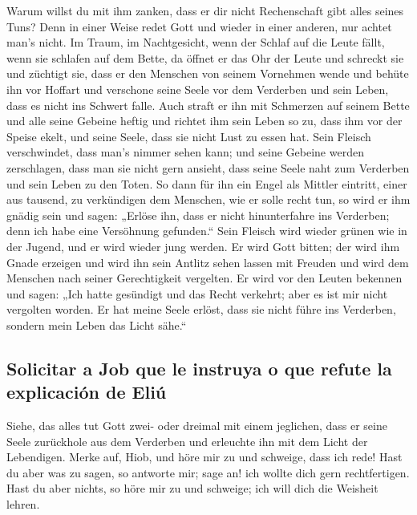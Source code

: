  Warum willst du mit ihm zanken, dass er dir nicht
Rechenschaft gibt alles seines Tuns?  Denn in einer Weise
redet Gott und wieder in einer anderen, nur achtet man's nicht.
 Im Traum, im Nachtgesicht, wenn der Schlaf auf die Leute
fällt, wenn sie schlafen auf dem Bette,  da öffnet er das
Ohr der Leute und schreckt sie und züchtigt sie,  dass er
den Menschen von seinem Vornehmen wende und behüte ihn vor Hoffart
 und verschone seine Seele vor dem Verderben und sein
Leben, dass es nicht ins Schwert falle.  Auch straft er
ihn mit Schmerzen auf seinem Bette und alle seine Gebeine heftig
 und richtet ihm sein Leben so zu, dass ihm vor der
Speise ekelt, und seine Seele, dass sie nicht Lust zu essen hat.
 Sein Fleisch verschwindet, dass man's nimmer sehen kann;
und seine Gebeine werden zerschlagen, dass man sie nicht gern ansieht,
 dass seine Seele naht zum Verderben und sein Leben zu
den Toten.  So dann für ihn ein Engel als Mittler
eintritt, einer aus tausend, zu verkündigen dem Menschen, wie er solle
recht tun,  so wird er ihm gnädig sein und sagen: „Erlöse
ihn, dass er nicht hinunterfahre ins Verderben; denn ich habe eine
Versöhnung gefunden.``  Sein Fleisch wird wieder grünen
wie in der Jugend, und er wird wieder jung werden.  Er
wird Gott bitten; der wird ihm Gnade erzeigen und wird ihn sein Antlitz
sehen lassen mit Freuden und wird dem Menschen nach seiner Gerechtigkeit
vergelten.  Er wird vor den Leuten bekennen und sagen:
„Ich hatte gesündigt und das Recht verkehrt; aber es ist mir nicht
vergolten worden.  Er hat meine Seele erlöst, dass sie
nicht führe ins Verderben, sondern mein Leben das Licht sähe.``

\hypertarget{solicitar-a-job-que-le-instruya-o-que-refute-la-explicaciuxf3n-de-eliuxfa}{%
\subsection{Solicitar a Job que le instruya o que refute la explicación
de
Eliú}\label{solicitar-a-job-que-le-instruya-o-que-refute-la-explicaciuxf3n-de-eliuxfa}}

 Siehe, das alles tut Gott zwei- oder dreimal mit einem
jeglichen,  dass er seine Seele zurückhole aus dem
Verderben und erleuchte ihn mit dem Licht der Lebendigen.
 Merke auf, Hiob, und höre mir zu und schweige, dass ich
rede!  Hast du aber was zu sagen, so antworte mir; sage
an! ich wollte dich gern rechtfertigen.  Hast du aber
nichts, so höre mir zu und schweige; ich will dich die Weisheit lehren.

